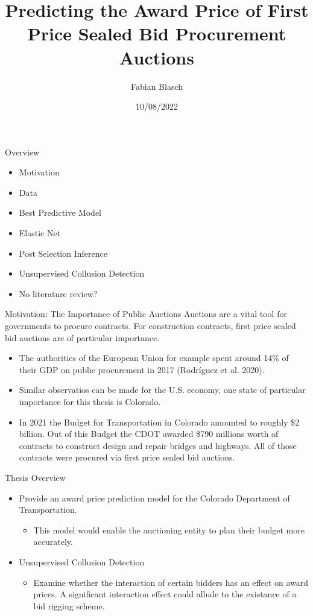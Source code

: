 \documentclass[
  11pt,
  ignorenonframetext,
]{beamer}
\title{Predicting the Award Price of First Price Sealed Bid Procurement
Auctions}
\author{Fabian Blasch}
\date{10/08/2022}
\providecommand{\tightlist}{%
  \setlength{\itemsep}{0pt}\setlength{\parskip}{0pt}}
\begin{document}
\frame{\titlepage}

\begin{frame}{Overview}
\protect\hypertarget{overview}{}
\begin{itemize}
\tightlist
\item
  Motivation
\item
  Data
\item
  Best Predictive Model
\item
  Elastic Net
\item
  Post Selection Inference
\item
  Unsupervised Collusion Detection
\item
  No literature review?
\end{itemize}
\end{frame}

\begin{frame}{Motivation: The Importance of Public Auctions}
\protect\hypertarget{motivation-the-importance-of-public-auctions}{}
Auctions are a vital tool for governments to procure contracts. For
construction contracts, first price sealed bid auctions are of
particular importance.

\begin{itemize}
\item
  The authorities of the European Union for example spent around 14\% of
  their GDP on public procurement in 2017 (Rodríguez et al. 2020).
\item
  Similar observatios can be made for the U.S. economy, one state of
  particular importance for this thesis is Colorado.
\item
  In 2021 the Budget for Transportation in Colorado amounted to roughly
  \$2 billion. Out of this Budget the CDOT awarded \$790 millions worth
  of contracts to construct design and repair bridges and highways. All
  of those contracts were procured via first price sealed bid auctions.
\end{itemize}
\end{frame}

\begin{frame}{Thesis Overview}
\protect\hypertarget{thesis-overview}{}
\begin{itemize}
\item
  Provide an award price prediction model for the Colorado Department of
  Transportation.

  \begin{itemize}
  \tightlist
  \item
    This model would enable the auctioning entity to plan their budget
    more accurately.
  \end{itemize}
\item
  Unsupervised Collusion Detection

  \begin{itemize}
  \tightlist
  \item
    Examine whether the interaction of certain bidders has an effect on
    award prices. A significant interaction effect could allude to the
    existance of a bid rigging scheme.
  \end{itemize}
\end{itemize}
\end{frame}
\end{document}
